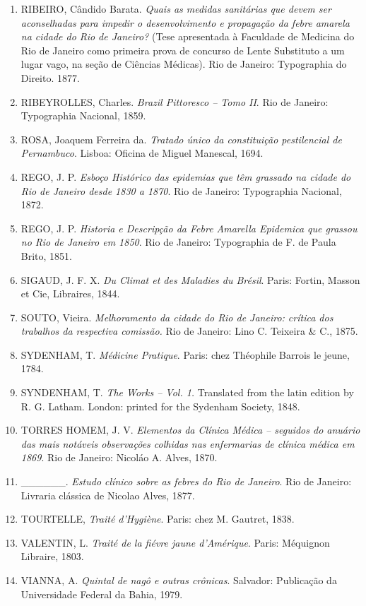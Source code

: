 \begin{enumerate}
\item
  RIBEIRO, Cândido Barata. \emph{Quais as medidas sanitárias que devem
  ser aconselhadas para impedir o desenvolvimento e propagação da febre
  amarela na cidade do Rio de Janeiro?} (Tese apresentada à Faculdade de
  Medicina do Rio de Janeiro como primeira prova de concurso de Lente
  Substituto a um lugar vago, na seção de Ciências Médicas). Rio de
  Janeiro: Typographia do Direito. 1877.
\item
  RIBEYROLLES, Charles. \emph{Brazil Pittoresco -- Tomo II}. Rio de
  Janeiro: Typographia Nacional, 1859.
\item
  ROSA, Joaquem Ferreira da. \emph{Tratado único da constituição
  pestilencial de Pernambuco}. Lisboa: Oficina de Miguel Manescal, 1694.
\item
  REGO, J. P. \emph{Esboço Histórico das epidemias que têm grassado na
  cidade do Rio de Janeiro desde 1830 a 1870}. Rio de Janeiro:
  Typographia Nacional, 1872.
\item
  REGO, J. P. \emph{Historia e Descripção da Febre Amarella Epidemica
  que grassou no Rio de Janeiro em 1850}. Rio de Janeiro: Typographia de
  F. de Paula Brito, 1851.
\item
  SIGAUD, J. F. X. \emph{Du Climat et des Maladies du Brésil}. Paris:
  Fortin, Masson et Cie, Libraires, 1844.
\item
  SOUTO, Vieira. \emph{Melhoramento da cidade do Rio de Janeiro: crítica
  dos trabalhos da respectiva comissão.} Rio de Janeiro: Lino C.
  Teixeira \& C., 1875.
\item
  SYDENHAM, T. \emph{Médicine Pratique}. Paris: chez Théophile Barrois
  le jeune, 1784.
\item
  SYNDENHAM, T. \emph{The Works -- Vol. 1.} Translated from the latin
  edition by R. G. Latham. London: printed for the Sydenham Society,
  1848.
\item
  TORRES HOMEM, J. V. \emph{Elementos da Clínica Médica -- seguidos do
  anuário das mais notáveis observações colhidas nas enfermarias de
  clínica médica em 1869}. Rio de Janeiro: Nicoláo A. Alves, 1870.
\item
  \_\_\_\_\_\_. \emph{Estudo clínico sobre as febres do Rio de Janeiro}.
  Rio de Janeiro: Livraria clássica de Nicolao Alves, 1877.
\item
  TOURTELLE, \emph{Traité d'Hygiène}. Paris: chez M. Gautret, 1838.
\item
  VALENTIN, L. \emph{Traité de la fiévre jaune d'Amérique}. Paris:
  Méquignon Libraire, 1803.
\item
  VIANNA, A. \emph{Quintal de nagô e outras crônicas}. Salvador:
  Publicação da Universidade Federal da Bahia, 1979.
\end{enumerate}

